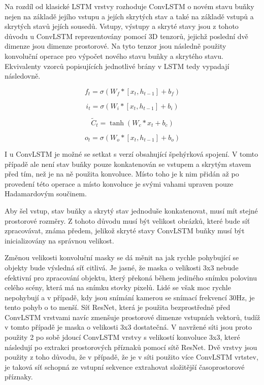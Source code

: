 Na rozdíl od klasické LSTM vrstvy rozhoduje ConvLSTM o novém stavu buňky nejen na základě jejího vstupu a jejích skrytých stav a také na základě vstupů a skrytých stavů jejích sousedů.
Vstupy, výstupy a skryté stavy jsou z tohoto důvodu u ConvLSTM reprezentovány pomocí 3D tenzorů, jejichž poslední dvě dimenze jsou dimenze prostorové.
Na tyto tenzor jsou následně použity konvoluční operace pro výpočet nového stavu buňky a skrytého stavu. Ekvivalenty vzorců popisujících jednotlivé brány v LSTM tedy vypadají následovně.

\begin{equation}
f_t = \sigma(W_{f} * [x_t, h_{t-1}] + b_f)
\label{eq:ConvLSTM_forget_gate}
\end{equation}

\begin{equation}
i_t = \sigma(W_{i} * [x_t, h_{t-1}] + b_i)
\label{eq:ConvLSTM_input_gate}
\end{equation}

\begin{equation}
\widetilde{C}_t = \tanh(W_{c} * x_t + b_c)
\label{eq:ConvLSTM_input_modulation_gate}
\end{equation}

\begin{equation}
o_t = \sigma(W_{o} * [x_t, h_{t-1}] + b_o)
\label{eq:ConvLSTM_output_gate}
\end{equation}

I u ConvLSTM je možné se setkat s verzí obsahující špehýrková spojení.
V tomto případě ale není stav buňky pouze konkatenován se vstupem a skrytým stavem před tím, než je na ně použita konvoluce.
Místo toho je k nim přidán až po provedení této operace a místo konvoluce je svými vahami upraven pouze Hadamardovým součinem.

Aby šel vstup, stav buňky a skrytý stav jednoduše konkatenovat, musí mít stejné prostorové rozměry.
Z tohoto důvodu musí být velikost obrázků, které bude síť zpracovávat, známa předem, jelikož skryté stavy ConvLSTM buňky musí být inicializovány na správnou velikost.

Změnou velikosti konvoluční masky se dá měnit na jak rychle pohybující se objekty bude výsledná síť citlivá.
Je jasné, že maska o velikosti 3x3 nebude efektivní pro zpracování objektu, který překoná během jediného snímku polovinu celého scény, která má na snímku stovky pixelů.
Lidé se však moc rychle nepohybují a v případě, kdy jsou snímání kamerou se snímací frekvencí 30Hz, je tento pohyb o to menší. Síť ResNet, která je použita bezprostředně před ConvLSTM vrstvami navíc zmenšuje prostorové dimenze vstupních vektorů, tudíž v tomto případě je maska o velikosti 3x3 dostatečná.
V navržené síti jsou proto použity 2 po sobě jdoucí ConvLSTM vrstvy s velikostí konvoluce 3x3, které následují po extrakci prostorových příznaků pomocí sítě ResNet.
Dvě vrstvy jsou použity z toho důvodu, že v případě, že je v síti použito více ConvLSTM vrtstev, je taková síť schopná ze vstupní sekvence extrahovat složitější časoprostorové příznaky.

\endinput